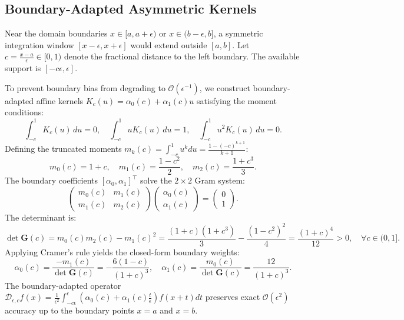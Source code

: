 \documentclass[11pt,a4paper]{article}
\theoremstyle{definition}
\begin{document}
\subsection{Boundary-Adapted Asymmetric Kernels}
Near the domain boundaries $x \in [a, a+\epsilon)$ or $x \in (b-\epsilon, b]$, a symmetric integration window $[x-\epsilon, x+\epsilon]$ would extend outside $[a, b]$. Let $c = \frac{x - a}{\epsilon} \in [0, 1)$ denote the fractional distance to the left boundary. The available support is $[-c\epsilon, \epsilon]$.

To prevent boundary bias from degrading to $\mathcal{O}(\epsilon^{-1})$, we construct boundary-adapted affine kernels $K_c(u) = \alpha_0(c) + \alpha_1(c) u$ satisfying the moment conditions:
\begin{equation}
\int_{-c}^1 K_c(u) \, du = 0, \quad \int_{-c}^1 u K_c(u) \, du = 1, \quad \int_{-c}^1 u^2 K_c(u) \, du = 0.
\label{eq:boundary_conditions}
\end{equation}
Defining the truncated moments $m_k(c) = \int_{-c}^1 u^k du = \frac{1 - (-c)^{k+1}}{k+1}$:
\begin{equation}
m_0(c) = 1 + c, \quad m_1(c) = \frac{1 - c^2}{2}, \quad m_2(c) = \frac{1 + c^3}{3}.
\end{equation}
The boundary coefficients $[\alpha_0, \alpha_1]^\top$ solve the $2 \times 2$ Gram system:
\begin{equation}
\begin{pmatrix} m_0(c) & m_1(c) \\ m_1(c) & m_2(c) \end{pmatrix} \begin{pmatrix} \alpha_0(c) \\ \alpha_1(c) \end{pmatrix} = \begin{pmatrix} 0 \\ 1 \end{pmatrix}.
\end{equation}
The determinant is:
\begin{equation}
\det \mathbf{G}(c) = m_0(c) m_2(c) - m_1(c)^2 = \frac{(1+c)(1+c^3)}{3} - \frac{(1-c^2)^2}{4} = \frac{(1+c)^4}{12} > 0, \quad \forall c \in (0, 1].
\end{equation}
Applying Cramer's rule yields the closed-form boundary weights:
\begin{equation}
\alpha_0(c) = \frac{-m_1(c)}{\det \mathbf{G}(c)} = -\frac{6(1 - c)}{(1 + c)^3}, \quad \alpha_1(c) = \frac{m_0(c)}{\det \mathbf{G}(c)} = \frac{12}{(1 + c)^3}.
\label{eq:boundary_coefficients}
\end{equation}
The boundary-adapted operator $\mathcal{D}_{\epsilon, c} f(x) = \frac{1}{\epsilon^2} \int_{-c\epsilon}^{\epsilon} (\alpha_0(c) + \alpha_1(c) \frac{t}{\epsilon}) f(x + t) dt$ preserves exact $\mathcal{O}(\epsilon^2)$ accuracy up to the boundary points $x = a$ and $x = b$.
\end{document}
